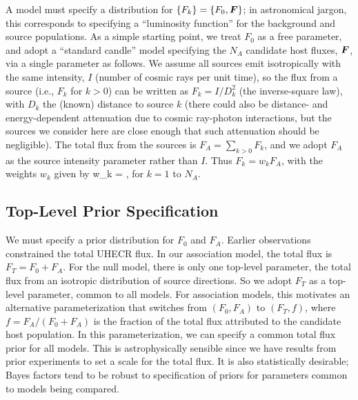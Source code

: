 
A model must specify a distribution for $\{F_k\} = \{F_0, \mbox{\boldmath{$F$}}\}$; in
astronomical jargon, this corresponds to specifying a ``luminosity function''
for the background and source populations.  As a simple starting point, we
treat $F_0$ as a free parameter, and adopt a ``standard candle'' model
specifying the $N_A$ candidate host fluxes, $\mbox{\boldmath{$F$}}$, via a single parameter
as follows.  We assume all sources emit isotropically with the same
intensity, $I$ (number of cosmic rays per unit time), so the flux from a
source (i.e., $F_k$ for $k>0$) can be written as $F_k = I/D_k^2$ (the
inverse-square law), with $D_k$ the (known) distance to source $k$ (there
could also be distance- and energy-dependent attenuation due to cosmic
ray-photon interactions, but the sources we consider here are close enough
that such attenuation should be negligible).  The total flux from the
sources is $F_A = \sum_{k>0} F_k$, and we adopt $F_A$ as the source
intensity parameter rather than $I$.  Thus $F_k = w_k F_A$, with the weights
$w_k$ given by
\be
w_k = ,
\label{wt-def}
\ee
for $k=1$ to $N_A$.

\subsection{Top-Level Prior Specification}

We must specify a prior distribution for $F_0$ and $F_A$.
Earlier observations constrained the total UHECR flux.  In our association
model, the total flux is $F_T = F_0 + F_A$.  For the null model, there is
only one top-level parameter, the total flux from an isotropic distribution
of source directions.  So we adopt $F_T$ as a top-level parameter,
common to all models.  For association models, this motivates an alternative
parameterization that switches from $(F_0, F_A)$ to $(F_T, f)$, where $f =
F_A/(F_0 + F_A)$ is the fraction of the total flux attributed to the
candidate host population.
In this parameterization, we can specify a common total flux prior
for all models.  This is astrophysically sensible since we have
results from prior experiments to set a scale for the total flux.
It is also statistically desirable; Bayes factors tend to be robust
to specification of priors for parameters common to models being compared.

